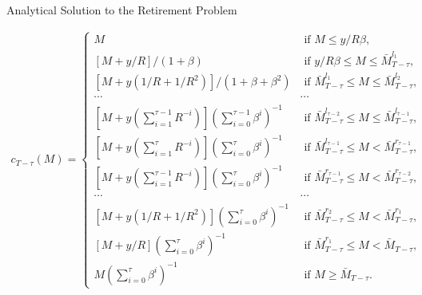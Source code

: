 \documentclass[aspectratio=169]{beamer}
\begin{document}
\begin{frame}{Analytical Solution to the Retirement Problem}\footnotesize
	
	\begin{theorem}
				
		\begin{equation}
			\label{7}
			\begin{aligned}
				c_{T- \tau}(M) = 
				\begin{cases}
					M & \text { if } M \leq y / R \beta, \\
					{[M+y / R] /(1+\beta)} & \text { if } y / R \beta \leq M \leq\bar{M}_{T-\tau}^{l_1}, \\
					{\left[M+y\left(1 / R+1 / R^2\right)\right] /\left(1+\beta+\beta^2\right)} &\text { if } \bar{M}_{T-\tau}^{l_1} \leq M \leq \bar{M}_{T-\tau}^{l_2}, \\
					\cdots & \cdots \\
					{\left[M+y\left(\sum_{i=1}^{\tau-1}R^{-i}\right)\right]\left(\sum_{i=0}^{\tau-1} \beta^i\right)^{-1}} & \text { if } \bar{M}_{T-\tau}^{l_{\tau-2}} \leq M \leq \bar{M}_{T-\tau}^{l_{\tau-1}}, \\
					{\left[M+y\left(\sum_{i=1}^\tau R^{-i}\right)\right]\left(\sum_{i=0}^\tau \beta^i\right)^{-1}} & \text { if } \bar{M}_{T-\tau}^{l_{\tau-1}} \leq M<\bar{M}_{T-\tau}^{r_{\tau-1}}, \\
					{\left[M+y\left(\sum_{i=1}^{\tau-1} R^{-i}\right)\right]\left(\sum_{i=0}^\tau \beta^i\right)^{-1}} & \text { if } \bar{M}_{T-\tau}^{r_{\tau-1}} \leq M<\bar{M}_{T-\tau}^{r_{\tau-2}}, \\
					\cdots & \cdots \\
					{\left[M+y\left(1 / R+1 / R^2\right)\right]\left(\sum_{i=0}^\tau\beta^i\right)^{-1}} & \text { if } \bar{M}_{T-\tau}^{r_2} \leq M<\bar{M}_{T-\tau}^{r_1}, \\
					{[M+y / R]\left(\sum_{i=0}^\tau \beta^i\right)^{-1}} & \text { if }\bar{M}_{T-\tau}^{r_1} \leq M<\bar{M}_{T-\tau}, \\
					{M\left(\sum_{i=0}^\tau \beta^i\right)^{-1}} & \text { if } M \geq\bar{M}_{T-\tau} .
				\end{cases}
			\end{aligned}
		\end{equation}
		
	\end{theorem}
\end{frame}
\end{document}

